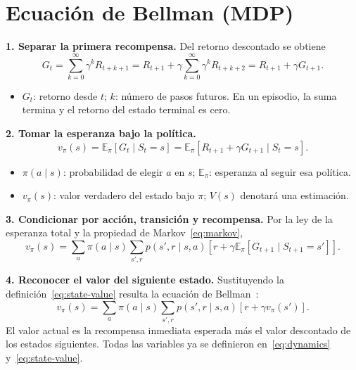 \section{Ecuación de Bellman (MDP)}

\textbf{1. Separar la primera recompensa.} Del retorno descontado se obtiene
\begin{equation}\label{eq:return}
    G_t=\sum_{k=0}^{\infty}\gamma^kR_{t+k+1}
    =R_{t+1}+\gamma\sum_{k=0}^{\infty}\gamma^kR_{t+k+2}
    =R_{t+1}+\gamma G_{t+1}.
\end{equation}
\begin{itemize}
    \item $G_t$: retorno desde $t$; $k$: número de pasos futuros. En un episodio, la suma termina y el retorno del estado terminal es cero.
\end{itemize}

\textbf{2. Tomar la esperanza bajo la política.}
\begin{equation}\label{eq:state-value}
    v_\pi(s)=\mathbb{E}_\pi[G_t\mid S_t=s]
    =\mathbb{E}_\pi[R_{t+1}+\gamma G_{t+1}\mid S_t=s].
\end{equation}
\begin{itemize}
    \item $\pi(a\mid s)$: probabilidad de elegir $a$ en $s$; $\mathbb{E}_\pi$: esperanza al seguir esa política.
    \item $v_\pi(s)$: valor verdadero del estado bajo $\pi$; $V(s)$ denotará una estimación.
\end{itemize}

\textbf{3. Condicionar por acción, transición y recompensa.} Por la ley de la esperanza total y la propiedad de Markov~\eqref{eq:markov},
\begin{equation}\label{eq:bellman-conditioning}
    v_\pi(s)=\sum_a\pi(a\mid s)\sum_{s',r}p(s',r\mid s,a)
    \left[r+\gamma\mathbb{E}_\pi[G_{t+1}\mid S_{t+1}=s']\right].
\end{equation}

\textbf{4. Reconocer el valor del siguiente estado.} Sustituyendo la definición~\eqref{eq:state-value} resulta la ecuación de Bellman~\cite[secc.~3.5]{sutton}:
\begin{equation}\label{eq:bellman}
    v_\pi(s)=\sum_a\pi(a\mid s)\sum_{s',r}p(s',r\mid s,a)
    \left[r+\gamma v_\pi(s')\right].
\end{equation}
El valor actual es la recompensa inmediata esperada más el valor descontado de los estados siguientes. Todas las variables ya se definieron en~\eqref{eq:dynamics} y~\eqref{eq:state-value}.
